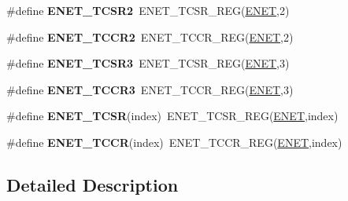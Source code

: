 \begin{DoxyCompactItemize}
\item 
\#define {\bfseries E\+N\+E\+T\+\_\+\+T\+C\+S\+R2}~E\+N\+E\+T\+\_\+\+T\+C\+S\+R\+\_\+\+R\+EG(\hyperlink{group__ENET__Peripheral__Access__Layer_ga4745105f505f3ab949d6a57fbe2a0ed5}{E\+N\+ET},2)\hypertarget{group__ENET__Register__Accessor__Macros_ga21b3e72b6e1c037ca832c45d63d99b7c}{}\label{group__ENET__Register__Accessor__Macros_ga21b3e72b6e1c037ca832c45d63d99b7c}

\item 
\#define {\bfseries E\+N\+E\+T\+\_\+\+T\+C\+C\+R2}~E\+N\+E\+T\+\_\+\+T\+C\+C\+R\+\_\+\+R\+EG(\hyperlink{group__ENET__Peripheral__Access__Layer_ga4745105f505f3ab949d6a57fbe2a0ed5}{E\+N\+ET},2)\hypertarget{group__ENET__Register__Accessor__Macros_ga27aa44036da0711f59e2acfe5c98e33b}{}\label{group__ENET__Register__Accessor__Macros_ga27aa44036da0711f59e2acfe5c98e33b}

\item 
\#define {\bfseries E\+N\+E\+T\+\_\+\+T\+C\+S\+R3}~E\+N\+E\+T\+\_\+\+T\+C\+S\+R\+\_\+\+R\+EG(\hyperlink{group__ENET__Peripheral__Access__Layer_ga4745105f505f3ab949d6a57fbe2a0ed5}{E\+N\+ET},3)\hypertarget{group__ENET__Register__Accessor__Macros_ga2ed276af054c1be2d6dc80eb7e62c5d5}{}\label{group__ENET__Register__Accessor__Macros_ga2ed276af054c1be2d6dc80eb7e62c5d5}

\item 
\#define {\bfseries E\+N\+E\+T\+\_\+\+T\+C\+C\+R3}~E\+N\+E\+T\+\_\+\+T\+C\+C\+R\+\_\+\+R\+EG(\hyperlink{group__ENET__Peripheral__Access__Layer_ga4745105f505f3ab949d6a57fbe2a0ed5}{E\+N\+ET},3)\hypertarget{group__ENET__Register__Accessor__Macros_ga71425ef7a21238436f0595fccd58d3b8}{}\label{group__ENET__Register__Accessor__Macros_ga71425ef7a21238436f0595fccd58d3b8}

\item 
\#define {\bfseries E\+N\+E\+T\+\_\+\+T\+C\+SR}(index)~E\+N\+E\+T\+\_\+\+T\+C\+S\+R\+\_\+\+R\+EG(\hyperlink{group__ENET__Peripheral__Access__Layer_ga4745105f505f3ab949d6a57fbe2a0ed5}{E\+N\+ET},index)\hypertarget{group__ENET__Register__Accessor__Macros_ga2365729c36b81a48c98e1e720f0cd726}{}\label{group__ENET__Register__Accessor__Macros_ga2365729c36b81a48c98e1e720f0cd726}

\item 
\#define {\bfseries E\+N\+E\+T\+\_\+\+T\+C\+CR}(index)~E\+N\+E\+T\+\_\+\+T\+C\+C\+R\+\_\+\+R\+EG(\hyperlink{group__ENET__Peripheral__Access__Layer_ga4745105f505f3ab949d6a57fbe2a0ed5}{E\+N\+ET},index)\hypertarget{group__ENET__Register__Accessor__Macros_ga825562724cc7a12f5f12f6ce79e48fa7}{}\label{group__ENET__Register__Accessor__Macros_ga825562724cc7a12f5f12f6ce79e48fa7}

\end{DoxyCompactItemize}


\subsection{Detailed Description}

